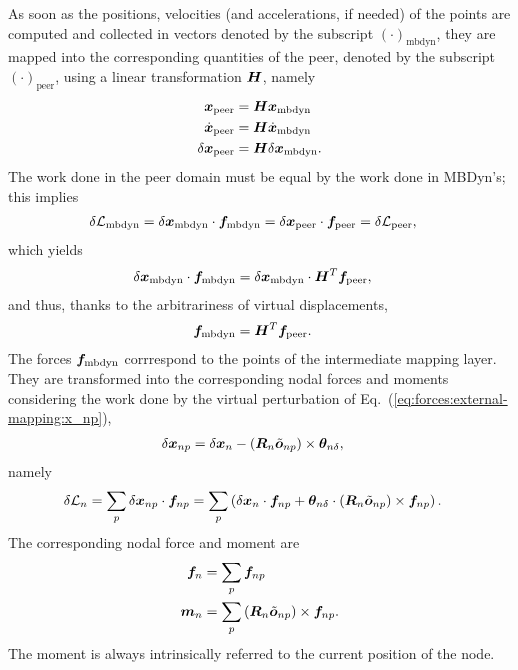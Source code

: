As soon as the positions, velocities (and accelerations, if needed)
of the points are computed and collected in vectors
denoted by the subscript $(\cdot)_\text{mbdyn}$,
they are mapped into the corresponding quantities
of the peer, denoted by the subscript $(\cdot)_\text{peer}$,
using a linear transformation $\bm{H}$, namely
\begin{align}
	\bm{x}_\text{peer}
	&=
	\bm{H} \bm{x}_\text{mbdyn}
	\\
	\dot{\bm{x}}_\text{peer}
	&=
	\bm{H} \dot{\bm{x}}_\text{mbdyn}
	\\
	\delta\bm{x}_\text{peer}
	&=
	\bm{H} \delta\bm{x}_\text{mbdyn}
	.
\end{align}
The work done in the peer domain must be equal by the work done
in MBDyn's; this implies
\begin{align}
	\delta\mathcal{L}_\text{mbdyn}
	&=
	\delta\bm{x}_\text{mbdyn} \cdot \bm{f}_\text{mbdyn}
	=
	\delta\bm{x}_\text{peer} \cdot \bm{f}_\text{peer}
	=
	\delta\mathcal{L}_\text{peer}
	,
\end{align}
which yields
\begin{align}
	\delta\bm{x}_\text{mbdyn} \cdot \bm{f}_\text{mbdyn}
	&=
	\delta\bm{x}_\text{mbdyn} \cdot \bm{H}^T \bm{f}_\text{peer}
	,
\end{align}
and thus, thanks to the arbitrariness of virtual displacements,
\begin{align}
	\bm{f}_\text{mbdyn}
	&=
	\bm{H}^T \bm{f}_\text{peer}
	.
\end{align}
The forces $\bm{f}_\text{mbdyn}$ corrrespond to the points
of the intermediate mapping layer.
They are transformed into the corresponding nodal forces and moments
considering the work done by the virtual perturbation
of Eq.~(\ref{eq:forces:external-mapping:x_np}),
\begin{align}
	\delta\bm{x}_{np}
	&=
	\delta\bm{x}_n
	-
	\left( \bm{R}_n \tilde{\bm{o}}_{np} \right) \times \bm{\theta}_{n\delta}
	,
\end{align}
namely
\begin{align}
	\delta\mathcal{L}_n
	&=
	\sum_p \delta\bm{x}_{np} \cdot \bm{f}_{np}
	=
	\sum_p \left( 
		\delta\bm{x}_n \cdot \bm{f}_{np}
		+
		\bm{\theta}_{n\delta} \cdot \left( \bm{R}_n \tilde{\bm{o}}_{np} \right) \times \bm{f}_{np}
	 \right)
	.
\end{align}
The corresponding nodal force and moment are
\begin{align}
	\bm{f}_n
	&=
	\sum_p \bm{f}_{np}
	\\
	\bm{m}_n
	&=
	\sum_p \left( \bm{R}_n \tilde{\bm{o}}_{np} \right) \times \bm{f}_{np}
	.
\end{align}
The moment is always intrinsically referred to the current position
of the node.

